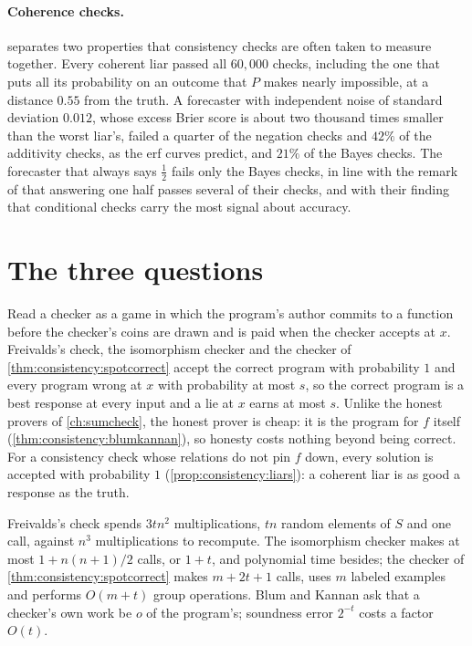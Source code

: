 \begin{refsection}
\paragraph{Coherence checks.}  separates two properties that consistency checks are often taken to measure together. Every coherent liar passed all $60{,}000$ checks, including the one that puts all its probability on an outcome that $P$ makes nearly impossible, at a distance $0.55$ from the truth. A forecaster with independent noise of standard deviation $0.012$, whose excess Brier score is about two thousand times smaller than the worst liar's, failed a quarter of the negation checks and $42\%$ of the additivity checks, as the erf curves predict, and $21\%$ of the Bayes checks. The forecaster that always says $\frac12$ fails only the Bayes checks, in line with the remark of \textcite{PalekaEtAl2025} that answering one half passes several of their checks, and with their finding that conditional checks carry the most signal about accuracy.

\section{The three questions}\label{sec:consistency:questions}

\questionone Read a checker as a game in which the program's author commits to a function before the checker's coins are drawn and is paid when the checker accepts at $x$. Freivalds's check, the isomorphism checker and the checker of \cref{thm:consistency:spotcorrect} accept the correct program with probability $1$ and every program wrong at $x$ with probability at most $s$, so the correct program is a best response at every input and a lie at $x$ earns at most $s$. Unlike the honest provers of \cref{ch:sumcheck}, the honest prover is cheap: it is the program for $f$ itself (\cref{thm:consistency:blumkannan}), so honesty costs nothing beyond being correct. For a consistency check whose relations do not pin $f$ down, every solution is accepted with probability $1$ (\cref{prop:consistency:liars}): a coherent liar is as good a response as the truth.

\questiontwo Freivalds's check spends $3tn^2$ multiplications, $tn$ random elements of $S$ and one call, against $n^3$ multiplications to recompute. The isomorphism checker makes at most $1+n(n+1)/2$ calls, or $1+t$, and polynomial time besides; the checker of \cref{thm:consistency:spotcorrect} makes $m+2t+1$ calls, uses $m$ labeled examples and performs $O(m+t)$ group operations. Blum and Kannan ask that a checker's own work be $o$ of the program's; soundness error $2^{-t}$ costs a factor $O(t)$.


\end{refsection}
